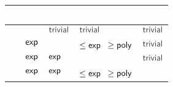\renewcommand{\hstdef}{.35}
\begin{tabular}{|l|l|l|p{2.9em}|l|}
	\hline
	~     & \ODFA   & \ONFA     & \TDFA                          & \TNFA     \\ \hline
	\ODFA & \cY     & $\Cctriv$ & $\Cctriv$                      & $\Cctriv$ \\ \hline
	\ONFA & $\mathsf{exp}$ & \cY       & \cR $\le\Cexp\hst$ $\ge\mathsf{poly}$ & $\Cctriv$ \\ \hline
	\TDFA & $\mathsf{exp}$ & $\mathsf{exp}$   & \cY                            & $\Cctriv$ \\ \hline
	\TNFA & $\mathsf{exp}$ & $\mathsf{exp}$   & \cR $\le\Cexp\hst$ $\ge\mathsf{poly}$ & \cY       \\ \hline
\end{tabular}
